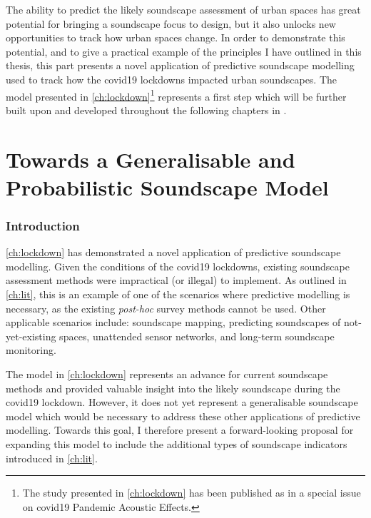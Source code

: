 \documentclass[oneside,fontsize=11pt,titlepage,chapterprefix=true
]{scrbook}
\begin{document}
The ability to predict the likely soundscape assessment of urban spaces has great potential for bringing a soundscape focus to design, but it also unlocks new opportunities to track how urban spaces change. In order to demonstrate this potential, and to give a practical example of the principles I have outlined in this thesis, this part presents a novel application of predictive soundscape modelling used to track how the \gls{covid19} lockdowns impacted urban soundscapes. The model presented in \cref{ch:lockdown}\footnote{The study presented in \cref{ch:lockdown} has been published as \citep{Mitchell2021Investigating} in a special issue on \gls{covid19} Pandemic Acoustic Effects. } represents a first step which will be further built upon and developed throughout the following chapters in \cref{part:generalModel}.




\part{Towards a Generalisable and Probabilistic Soundscape Model}
\label{part:generalModel}
\section*{Introduction}
\cref{ch:lockdown} has demonstrated a novel application of predictive soundscape modelling. Given the conditions of the \gls{covid19} lockdowns, existing soundscape assessment methods were impractical (or illegal) to implement. As outlined in \cref{ch:lit}, this is an example of one of the scenarios where predictive modelling is necessary, as the existing \emph{post-hoc} survey methods cannot be used. Other applicable scenarios include: soundscape mapping, predicting soundscapes of not-yet-existing spaces, unattended sensor networks, and long-term soundscape monitoring.

The model in \cref{ch:lockdown} represents an advance for current soundscape methods and provided valuable insight into the likely soundscape during the \gls{covid19} lockdown. However, it does not yet represent a generalisable soundscape model which would be necessary to address these other applications of predictive modelling. Towards this goal, I therefore present a forward-looking proposal for expanding this model to include the additional types of soundscape indicators introduced in \cref{ch:lit}.
\end{document}

